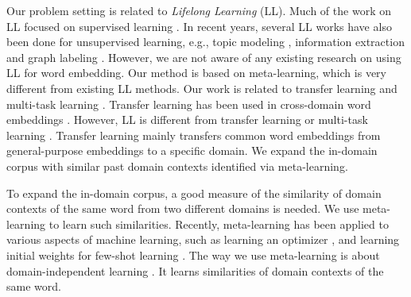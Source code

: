 Our problem setting is related to \textit{Lifelong Learning} (LL). Much of the work on LL focused on supervised learning \cite{Thrun1996learning,Silver2013,ChenLiu2016}.
In recent years, several LL works have also been done for unsupervised learning, e.g., topic modeling \cite{chen2014topic}, information extraction \cite{Mitchell2015} and graph labeling \cite{shu2016lifelong}. 
However, we are not aware of any existing research on using LL for word embedding. Our method is based on meta-learning, which is very different from existing LL methods.
Our work is related to transfer learning and multi-task learning \cite{pan2010survey}. Transfer learning has been used in cross-domain word embeddings \cite{bollegala-maehara-kawarabayashi:2015:ACL-IJCNLP,yang-lu-zheng:2017:EMNLP2017}. However, LL is different from transfer learning or multi-task learning \cite{ChenLiu2016}. 
Transfer learning mainly transfers common word embeddings from general-purpose embeddings to a specific domain. We expand the in-domain corpus with similar past domain contexts identified via meta-learning. 

To expand the in-domain corpus, a good measure of the similarity of domain contexts of the same word from two different domains is needed.
We use meta-learning \cite{thrun2012learning} to learn such similarities.
Recently, meta-learning has been applied to various aspects of machine learning, 
such as learning an optimizer \cite{andrychowicz2016learning},
and learning initial weights for few-shot learning \cite{finn2017model}.
The way we use meta-learning is about domain-independent learning \cite{JMLR:v17:15-239}. It learns similarities of domain contexts of the same word.


